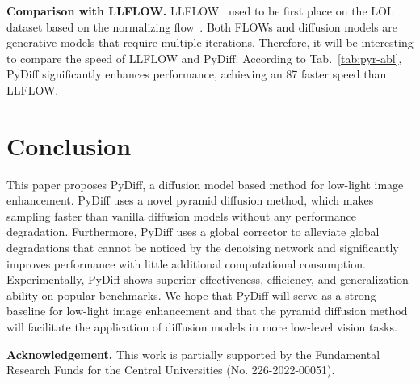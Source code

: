 \documentclass{article}
\begin{document}
\noindent \textbf{Comparison with LLFLOW.} 
LLFLOW~\cite{wang2022low} used to be first place on the LOL dataset based on the normalizing flow~\cite{dinh2016density,kingma2018glow}. Both FLOWs and diffusion models are generative models that require multiple iterations. Therefore, it will be interesting to compare the speed of LLFLOW and PyDiff. According to Tab.~\ref{tab:pyr-abl}, PyDiff significantly enhances performance, achieving an 87 faster speed than LLFLOW.



\section{Conclusion}
This paper proposes PyDiff, a diffusion model based method for low-light image enhancement. PyDiff uses a novel pyramid diffusion method, which makes sampling faster than vanilla diffusion models without any performance degradation. Furthermore, PyDiff uses a global corrector to alleviate global degradations that cannot be noticed by the denoising network and significantly improves performance with little additional computational consumption. Experimentally, PyDiff shows superior effectiveness, efficiency, and generalization ability on popular benchmarks. We hope that PyDiff will serve as a strong baseline for low-light image enhancement and that the pyramid diffusion method will facilitate the application of diffusion models in more low-level vision tasks.

\noindent\textbf{Acknowledgement.} This work is partially supported by the Fundamental Research Funds for the Central Universities (No. 226-2022-00051).




\end{document}
